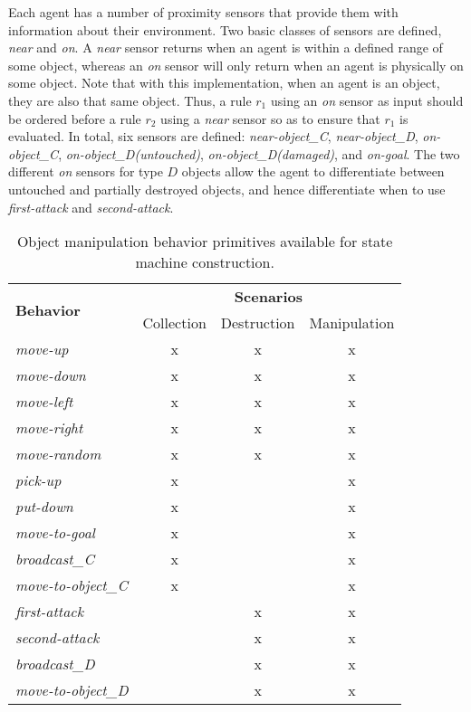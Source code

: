 Each agent has a number of proximity sensors that provide them with information about their environment.  Two basic classes of sensors are defined, \emph{near} and \emph{on}.  A \emph{near} sensor returns \true{} when an agent is within a defined range of some object, whereas an \emph{on} sensor will only return \true{} when an agent is physically on some object.  Note that with this implementation, when an agent is  an object, they are also  that same object.  Thus,  a rule $r_1$ using an \emph{on} sensor as input should be ordered before a rule $r_2$ using a \emph{near} sensor so as to ensure that $r_1$ is evaluated.  In total, six sensors are defined: \emph{near-object\_C}, \emph{near-object\_D}, \emph{on-object\_C}, \emph{on-object\_D(untouched)}, \emph{on-object\_D(damaged)}, and \emph{on-goal}.  The two different \emph{on} sensors for type $D$ objects allow the agent to differentiate between untouched and partially destroyed objects, and hence differentiate when to use \emph{first-attack} and \emph{second-attack}.


\begin{table}[ht]
  \centering
    \begin{tabular}{|l||c|c|c|}
      \hline
      \multirow{2}{*}{\textbf{Behavior}} & \multicolumn{3}{c|}{\textbf{Scenarios}}  \\
       & Collection & Destruction & Manipulation \\
      \hline
      \hline
      \emph{move-up}           & x & x & x \\
      \emph{move-down}         & x & x & x \\
      \emph{move-left}         & x & x & x \\
      \emph{move-right}        & x & x & x \\
      \emph{move-random}       & x & x & x \\
      \hline
      \emph{pick-up}           & x &   & x \\
      \emph{put-down}          & x &   & x \\
      \emph{move-to-goal}      & x &   & x \\
      \emph{broadcast\_C}      & x &   & x \\
      \emph{move-to-object\_C} & x &   & x \\
      \hline
      \emph{first-attack}      &   & x & x \\
      \emph{second-attack}     &   & x & x \\
      \emph{broadcast\_D}      &   & x & x \\ 
      \emph{move-to-object\_D} &   & x & x \\
      \hline
    \end{tabular}
	\caption{Object manipulation behavior primitives available for state machine construction.}
    \label{tab:ObjectActions}
\end{table}

